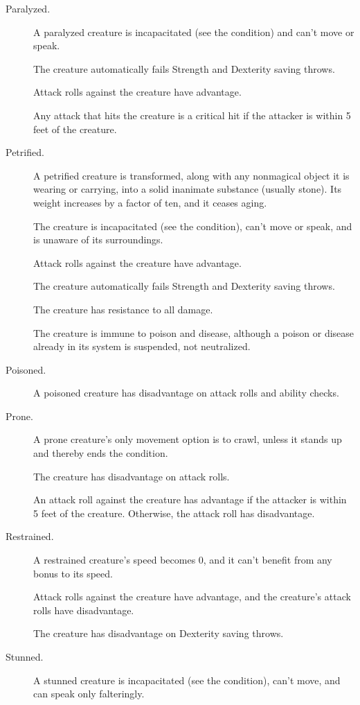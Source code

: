 \begin{description}
    \item[Paralyzed.] A paralyzed creature is incapacitated (see the condition) and can’t move or speak.

    The creature automatically fails Strength and Dexterity saving throws.

    Attack rolls against the creature have advantage.

    Any attack that hits the creature is a critical hit if the attacker is within 5 feet of the creature.

    \item[Petrified.] A petrified creature is transformed, along with any nonmagical object it is wearing or carrying, into a solid inanimate substance (usually stone). Its weight increases by a factor of ten, and it ceases aging.

    The creature is incapacitated (see the condition), can’t move or speak, and is unaware of its surroundings.

    Attack rolls against the creature have advantage.

    The creature automatically fails Strength and Dexterity saving throws.

    The creature has resistance to all damage.

    The creature is immune to poison and disease, although a poison or disease already in its system is suspended, not neutralized.

    \item[Poisoned.] A poisoned creature has disadvantage on attack rolls and ability checks.

    \item[Prone.] A prone creature’s only movement option is to crawl, unless it stands up and thereby ends the condition.

    The creature has disadvantage on attack rolls.

    An attack roll against the creature has advantage if the attacker is within 5 feet of the creature. Otherwise, the attack roll has disadvantage.

    \item[Restrained.] A restrained creature’s speed becomes 0, and it can’t benefit from any bonus to its speed.

    Attack rolls against the creature have advantage, and the creature’s attack rolls have disadvantage.

    The creature has disadvantage on Dexterity saving throws.

    \item[Stunned.] A stunned creature is incapacitated (see the condition), can’t move, and can speak only falteringly.


\end{description}
